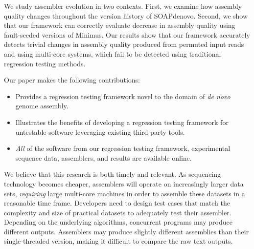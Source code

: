 We study assembler evolution in two contexts. First,
we examine how assembly quality changes
throughout the version history of SOAPdenovo. Second,
we show that our framework can correctly evaluate decrease in assembly quality
using fault-seeded versions of Minimus.
Our results show that our framework accurately detects trivial
changes in assembly quality produced from permuted input reads and using
multi-core systems, which fail to be detected using traditional regression
testing methods.

Our paper makes the following contributions:

\begin{itemize}

\item
Provides a regression testing framework novel to the domain of \emph{de novo} genome assembly.

\item
Illustrates the benefits of developing a regression testing framework for untestable software leveraging existing third party tools.

\item
\emph{All} of the software from our regression testing framework, experimental sequence data, assemblers, and results are available online.

\end{itemize}

We believe that this research is both timely and relevant.  As sequencing
technology becomes cheaper, assemblers will operate on increasingly larger data
sets, \emph{requiring} large multi-core machines in order to assemble these
datasets in a reasonable time frame.  Developers need to design test cases
that match the complexity and size of practical datasets to adequately test
their assembler.  Depending on the underlying algorithms, concurrent programs
may produce different outputs.  Assemblers may produce slightly different
assemblies than their single-threaded version, making it difficult to compare
the raw text outputs.

